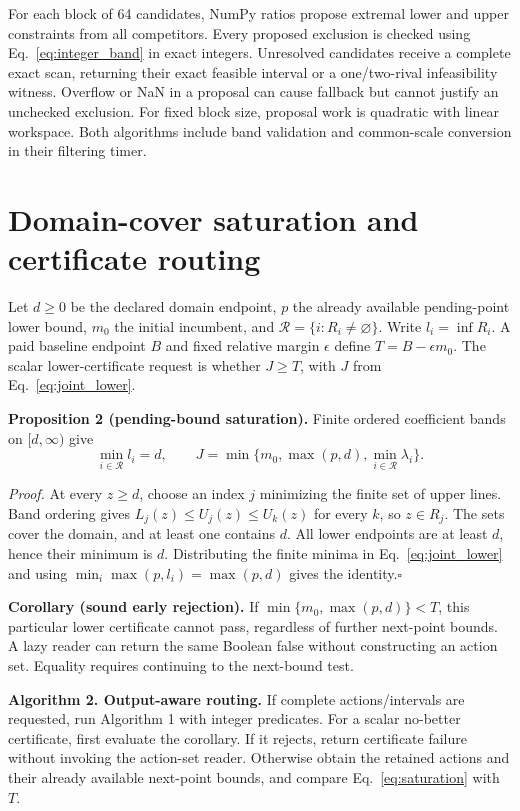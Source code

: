 \documentclass[]{interact}
\begin{document}
For each block of 64 candidates, NumPy ratios propose extremal lower and upper constraints from all competitors. Every proposed exclusion is checked using Eq.~\eqref{eq:integer_band} in exact integers. Unresolved candidates receive a complete exact scan, returning their exact feasible interval or a one/two-rival infeasibility witness. Overflow or NaN in a proposal can cause fallback but cannot justify an unchecked exclusion. For fixed block size, proposal work is quadratic with linear workspace. Both algorithms include band validation and common-scale conversion in their filtering timer.

\section{Domain-cover saturation and certificate routing}

Let $d\geq0$ be the declared domain endpoint, $p$ the already available pending-point lower bound, $m_0$ the initial incumbent, and $\mathcal R=\{i:R_i\ne\varnothing\}$. Write $l_i=\inf R_i$. A paid baseline endpoint $B$ and fixed relative margin $\epsilon$ define $T=B-\epsilon m_0$. The scalar lower-certificate request is whether $J\geq T$, with $J$ from Eq.~\eqref{eq:joint_lower}.

\textbf{Proposition 2 (pending-bound saturation).} Finite ordered coefficient bands on $[d,\infty)$ give
\begin{equation}
 \min_{i\in\mathcal R}l_i=d,\qquad
 J=\min\{m_0,\max(p,d),\min_{i\in\mathcal R}\lambda_i\}.
 \label{eq:saturation}
\end{equation}

\textit{Proof.} At every $z\geq d$, choose an index $j$ minimizing the finite set of upper lines. Band ordering gives $L_j(z)\leq U_j(z)\leq U_k(z)$ for every $k$, so $z\in R_j$. The sets cover the domain, and at least one contains $d$. All lower endpoints are at least $d$, hence their minimum is $d$. Distributing the finite minima in Eq.~\eqref{eq:joint_lower} and using $\min_i\max(p,l_i)=\max(p,d)$ gives the identity.\hfill$\square$

\textbf{Corollary (sound early rejection).} If $\min\{m_0,\max(p,d)\}<T$, this particular lower certificate cannot pass, regardless of further next-point bounds. A lazy reader can return the same Boolean false without constructing an action set. Equality requires continuing to the next-bound test.

\textbf{Algorithm 2. Output-aware routing.} If complete actions/intervals are requested, run Algorithm 1 with integer predicates. For a scalar no-better certificate, first evaluate the corollary. If it rejects, return certificate failure without invoking the action-set reader. Otherwise obtain the retained actions and their already available next-point bounds, and compare Eq.~\eqref{eq:saturation} with $T$.
\end{document}
